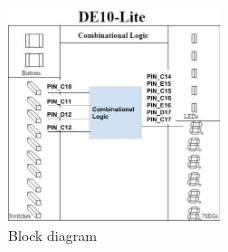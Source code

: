 \documentclass[12pt]{article}
\begin{document}
\begin{figure}[h]
  \centering
  \includegraphics[width=0.5\textwidth]{lab3_block_diagram.png}
  \caption{Block diagram}
  \label{figure:2}
\end{figure}
\end{document}
